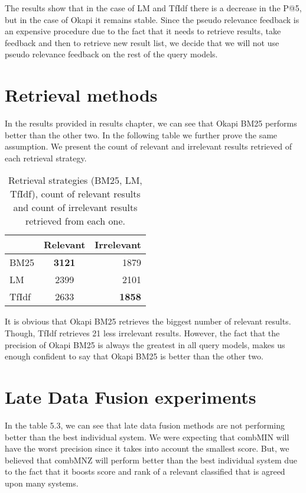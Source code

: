 The results show that in the case of LM and TfIdf there is a decrease in the P@5, but in the case of Okapi it remains stable. Since the pseudo relevance feedback is an expensive procedure due to the fact that it needs to retrieve results, take feedback and then to retrieve new result list, we decide that we will not use pseudo relevance feedback on the rest of the query models.



\section{Retrieval methods}

In the results provided in results chapter, we can see that Okapi BM25 performs better than the other two. In the following table we further prove the same assumption. We present the count of relevant and irrelevant results retrieved of each retrieval strategy.

\begin{table}[h]
\begin{center}
\caption{Retrieval strategies (BM25, LM, TfIdf), count of relevant results and count of irrelevant results retrieved from each one.}

\begin{tabular}{lcr}
\midrule
 & Relevant & Irrelevant  \\
\midrule
	BM25 & \textbf{3121} & 1879 \\
	LM & 2399 & 2101 \\
	TfIdf & 2633 & \textbf{1858} \\
\bottomrule
\end{tabular}
\end{center}
\end{table}

It is obvious that Okapi BM25 retrieves the biggest number of relevant results. Though, TfIdf retrieves 21 less irrelevant results. However, the fact that the precision of Okapi BM25 is always the greatest in all query models, makes us enough confident to say that Okapi BM25 is better than the other two.

\section{Late Data Fusion experiments}

In the table 5.3, we can see that late data fusion methods are not performing better than the best individual system. We were expecting that combMIN will have the worst precision since it takes into account the smallest score. But, we believed that combMNZ will perform better than the best individual system due to the fact that it boosts score and rank of a relevant classified that is agreed upon many systems.

